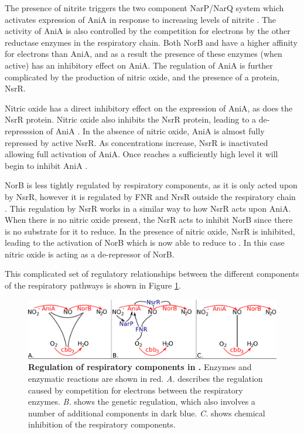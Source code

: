The presence of nitrite triggers the two component NarP/NarQ system which activates expression of AniA in response to increasing levels of nitrite \cite{Rock2005}. The activity of AniA is also controlled by the competition for electrons by the other reductase enzymes in the respiratory chain. Both NorB and \cbbthree{} have a higher affinity for electrons than AniA, and as a result the presence of these enzymes (when active) has an inhibitory effect on AniA. The regulation of AniA is further complicated by the production of nitric oxide, and the presence of a protein, NsrR.

Nitric oxide has a direct inhibitory effect on the expression of AniA, as does the NsrR protein. Nitric oxide also inhibits the NsrR protein, leading to a de-represssion of AniA \cite{Heurlier2008}. In the absence of nitric oxide, AniA is almost fully repressed by active NsrR. As \cNO{} concentrations increase, NsrR is inactivated allowing full activation of AniA. Once \cNO{} reaches a sufficiently high level it will begin to inhibit AniA \cite{Rock2005,Rock2007}.

NorB is less tightly regulated by respiratory components, as it is only acted upon by NsrR, however it is regulated by FNR and NrsR outside the respiratory chain \cite{Isabella2008}. This regulation by NsrR works in a similar way to how NsrR acts upon AniA. When there is no nitric oxide present, the NsrR acts to inhibit NorB since there is no substrate for it to reduce. In the presence of nitric oxide, NsrR is inhibited, leading to the activation of NorB which is now able to reduce \cNO{} to \cNtwoO{}. In this case nitric oxide is acting as a de-repressor of NorB.

This complicated set of regulatory relationships between the different components of the respiratory pathways is shown in Figure \ref{fig:respiratory-pathway}.

\begin{figure}[tbp]
 \begin{center}
 \includegraphics[width=14cm]{./01-introduction/data/regulation.pdf}
\end{center}
\caption[{\bf Regulation of respiratory components in \Nsm{}.}]{{\bf Regulation of respiratory components in \Nsm{}.} Enzymes and enzymatic reactions are shown in red. \textit{A.} describes the regulation caused by competition for electrons between the respiratory enzymes. \textit{B.} shows the genetic regulation, which also involves a number of additional components in dark blue. \textit{C.} shows chemical inhibition of the respiratory components.
\label{fig:respiratory-pathway}}
\end{figure}

